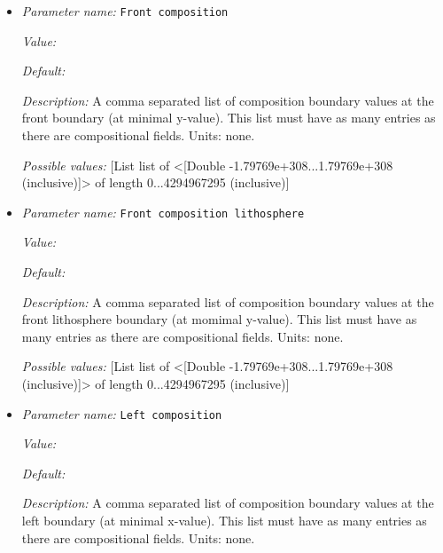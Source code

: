 \begin{itemize}
{\it Possible values:} [List list of <[Double -1.79769e+308...1.79769e+308 (inclusive)]> of length 0...4294967295 (inclusive)]
\item {\it Parameter name:} {\tt Front composition}
\label{parameters:Boundary composition model/Box with lithosphere boundary indicators/Front composition}


{\it Value:} 


{\it Default:} 


{\it Description:} A comma separated list of composition boundary values at the front boundary (at minimal y-value). This list must have as many entries as there are compositional fields. Units: none.


{\it Possible values:} [List list of <[Double -1.79769e+308...1.79769e+308 (inclusive)]> of length 0...4294967295 (inclusive)]
\item {\it Parameter name:} {\tt Front composition lithosphere}
\label{parameters:Boundary composition model/Box with lithosphere boundary indicators/Front composition lithosphere}


{\it Value:} 


{\it Default:} 


{\it Description:} A comma separated list of composition boundary values at the front lithosphere boundary (at momimal y-value). This list must have as many entries as there are compositional fields. Units: none.


{\it Possible values:} [List list of <[Double -1.79769e+308...1.79769e+308 (inclusive)]> of length 0...4294967295 (inclusive)]
\item {\it Parameter name:} {\tt Left composition}
\label{parameters:Boundary composition model/Box with lithosphere boundary indicators/Left composition}


{\it Value:} 


{\it Default:} 


{\it Description:} A comma separated list of composition boundary values at the left boundary (at minimal x-value). This list must have as many entries as there are compositional fields. Units: none.



\end{itemize}
